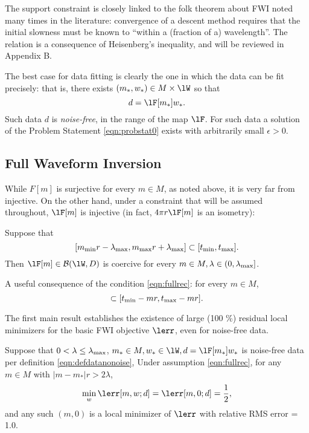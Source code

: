  The support constraint is closely linked to the
folk theorem about FWI noted many times in the literature: convergence
of a descent method requires that the initial slowness must be known
to ``within a (fraction of a) wavelength''. The relation is a
consequence of Heisenberg's inequality, and will be reviewed in
Appendix B.

The best case for data fitting
is clearly the one in which the data can be fit precisely: that is,
there exists $(m_*,w_*) \in M\times \lW$ so that
\begin{equation}
  \label{eqn:defdatanonoise}
  d=\lF[m_*]w_*.
\end{equation}
Such data $d$ is {\em noise-free}, in the range of the map $\lF$. For
such data a solution of the Problem Statement \ref{eqn:probstat0}
exists with arbitrarily small $\epsilon>0$.


\subsection{Full Waveform Inversion}
While $F[m]$ is surjective for every $m \in M$, as noted above, it is
very far from injective. On the other hand, under a constraint that
will be assumed throughout, $\lF[m]$ is injective (in fact, $4 \pi r
\lF[m]$ is an isometry):
\begin{proposition}
  \label{thm:fullrec}
  Suppose that 
  \begin{equation}
    \label{eqn:fullrec}
    [ m_{\rm min}r-\lambda_{\rm max}, m_{\rm max}r+\lambda_{\rm max}]
    \subset [t_{\rm min},t_{\rm max}].
  \end{equation}
  Then $\lF[m]\in {\cal B}(\lW,D)$ is coercive for every $m \in M, \lambda \in
  (0,\lambda_{\rm max}]$.
\end{proposition}

 A useful consequence of the condition 
\ref{eqn:fullrec}: for every $m \in M$, 
\begin{equation}
  [-\lambda_{\rm max}, -\lambda_{\rm max}] \subset[ t_{\rm min}-mr , 
  t_{\rm max}-mr]. 
  \label{eqn:zeroinc}
\end{equation}

The first main result establishes the existence of large (100 \%)
residual local minimizers for the basic FWI objective $\lerr$, even
for noise-free data.
\begin{theorem}
  \label{thm:fwi}
  Suppose that $0 <\lambda\le \lambda_{\rm max}$,  $m_* \in M, w_*
  \in \lW, d=\lF[m_*]w_*$ is noise-free data per definition \ref{eqn:defdatanonoise},
  Under assumption \ref{eqn:fullrec}, for any $m \in M$ with $|m-m_*|r>2\lambda$,
\begin{equation}
  \label{eqn:isovpm}
 \min_w \lerr[m,w;d]=\lerr[m,0;d] = \frac{1}{2},
\end{equation}
and any such $(m,0)$ is a local minimizer of $\lerr$ with relative RMS
error = 1.0.
\end{theorem}

